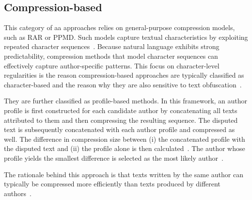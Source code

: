 \subsection{Compression-based}
This category of \ac{aa} approaches relies on general-purpose compression models, such as RAR or PPMD. %
Such models capture textual characteristics by exploiting repeated character sequences~\citep{stamatatos_survey_2009,neal_surveying_2018}. 
Because natural language exhibits strong predictability, compression methods that model character sequences can effectively capture author-specific patterns.
This focus on character-level regularities is the reason compression-based approaches are typically classified as character-based and the reason why they are also sensitive to text obfuscation~\citep{bevendorff_divergence_based_2020}.

They are further classified as profile-based methods. In this framework, an author profile is first constructed for each candidate author by concatenating all texts attributed to them and then compressing the resulting sequence. 
The disputed text is subsequently concatenated with each author profile and compressed as well. 
The difference in compression size between (i) the concatenated profile with the disputed text and (ii) the profile alone is then calculated~\citep{stamatatos_survey_2009,elmanarelbouanani_authorship_2014,neal_surveying_2018}. 
The author whose profile yields the smallest difference is selected as the most likely author~\citep{stamatatos_survey_2009,elmanarelbouanani_authorship_2014}.

The rationale behind this approach is that texts written by the same author can typically be compressed more efficiently than texts produced by different authors~\citep{stamatatos_survey_2009,elmanarelbouanani_authorship_2014}.


